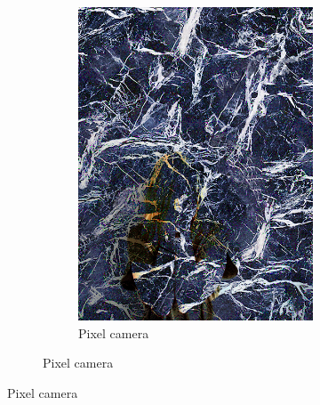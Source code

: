 \begin{figure}[]
\begin{subfigure}{\textwidth}
\begin{subfigure}{0.24\textwidth}
            \includegraphics[width=\textwidth]{images/04-experiment02/human/marble/pixel_proj.jpg}
            \caption*{Pixel camera}
        \end{subfigure}
    \end{subfigure}


\end{figure}
